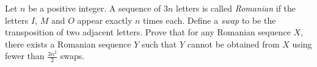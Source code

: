 Let $n$ be a positive integer.
A sequence of $3n$ letters is called \emph{Romanian} if
the letters $I$, $M$ and $O$ appear exactly $n$ times each.
Define a \emph{swap} to be the transposition of two adjacent letters.
Prove that for any Romanian sequence $X$,
there exists a Romanian sequence $Y$ such that $Y$ cannot be obtained from $X$ using
fewer than $\frac{3n^2}{2}$ swaps.
